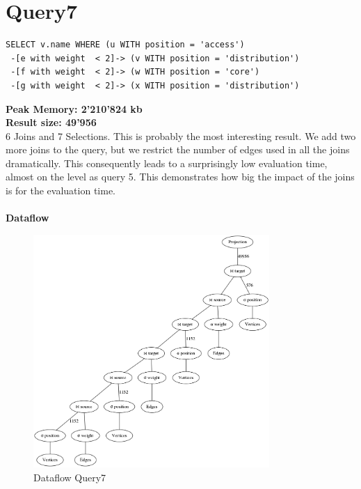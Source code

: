 \documentclass[11pt,singlecolumn]{scrartcl}
\begin{document}
\section{Query7}
\begin{verbatim}
SELECT v.name WHERE (u WITH position = 'access')
 -[e with weight  < 2]-> (v WITH position = 'distribution')
 -[f with weight  < 2]-> (w WITH position = 'core')
 -[g with weight  < 2]-> (x WITH position = 'distribution')\end{verbatim}
\textbf{Peak Memory: 2'210'824 kb}\\
\textbf{Result size: 49'956}\\
6 Joins and 7 Selections. This is probably the most interesting result. We add two more joins to the query, but we restrict the number of edges used in all the joins dramatically. This consequently leads to a surprisingly low evaluation time, almost on the level as query 5. This demonstrates how big the impact of the joins is for the evaluation time.\\\\
\textbf{Dataflow}
\begin{figure}[H]
\includegraphics[width=0.8\textwidth]{graph7}
\caption{Dataflow Query7}
\end{figure}
\clearpage
\end{document}
